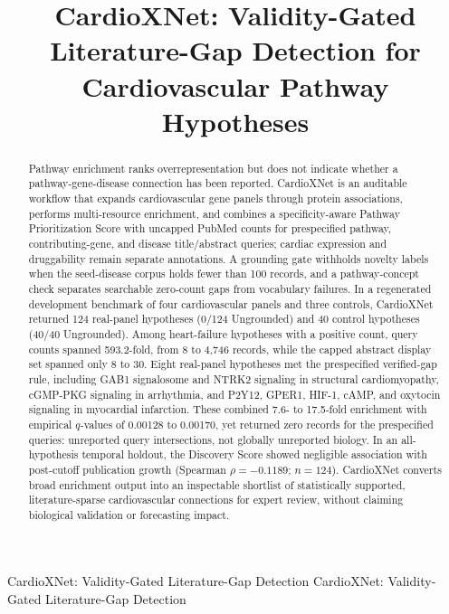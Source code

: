 \documentclass{ieeeaccess}
\begin{document}
\history{}
\doi{}

\title{CardioXNet: Validity-Gated Literature-Gap Detection for Cardiovascular Pathway Hypotheses}
\author{}
\address{Department of Biomedical Engineering, The University of Alabama at Birmingham, Birmingham, AL 35294 USA}

\markboth
{CardioXNet: Validity-Gated Literature-Gap Detection}
{CardioXNet: Validity-Gated Literature-Gap Detection}

\begin{abstract}
Pathway enrichment ranks overrepresentation but does not indicate whether a pathway-gene-disease connection has been reported. CardioXNet is an auditable workflow that expands cardiovascular gene panels through protein associations, performs multi-resource enrichment, and combines a specificity-aware Pathway Prioritization Score with uncapped PubMed counts for prespecified pathway, contributing-gene, and disease title/abstract queries; cardiac expression and druggability remain separate annotations. A grounding gate withholds novelty labels when the seed-disease corpus holds fewer than 100 records, and a pathway-concept check separates searchable zero-count gaps from vocabulary failures. In a regenerated development benchmark of four cardiovascular panels and three controls, CardioXNet returned 124 real-panel hypotheses (0/124 Ungrounded) and 40 control hypotheses (40/40 Ungrounded). Among heart-failure hypotheses with a positive count, query counts spanned 593.2-fold, from 8 to 4,746 records, while the capped abstract display set spanned only 8 to 30. Eight real-panel hypotheses met the prespecified verified-gap rule, including GAB1 signalosome and NTRK2 signaling in structural cardiomyopathy, cGMP-PKG signaling in arrhythmia, and P2Y12, GPER1, HIF-1, cAMP, and oxytocin signaling in myocardial infarction. These combined 7.6- to 17.5-fold enrichment with empirical $q$-values of 0.00128 to 0.00170, yet returned zero records for the prespecified queries: unreported query intersections, not globally unreported biology. In an all-hypothesis temporal holdout, the Discovery Score showed negligible association with post-cutoff publication growth (Spearman $\rho=-0.1189$; $n=124$). CardioXNet converts broad enrichment output into an inspectable shortlist of statistically supported, literature-sparse cardiovascular connections for expert review, without claiming biological validation or forecasting impact.
\end{abstract}
\end{document}
